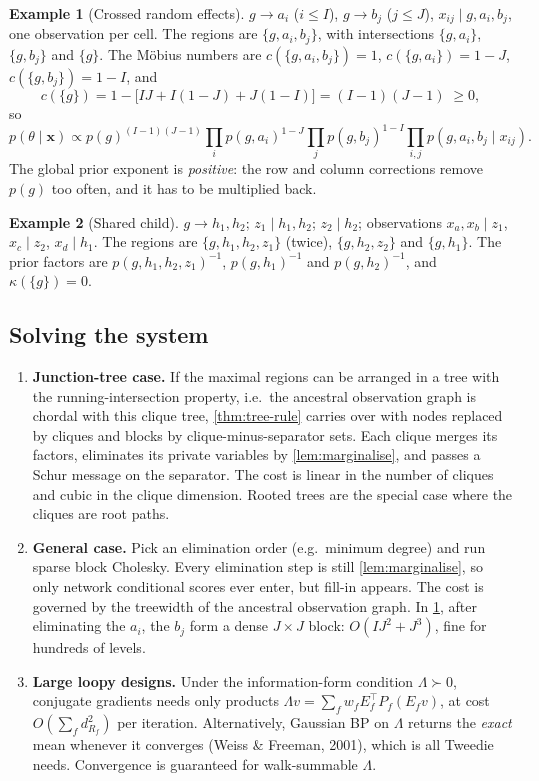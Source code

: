 \documentclass[11pt]{article}
\theoremstyle{definition}
\newtheorem{example}{Example}
\theoremstyle{remark}
\newcommand{\T}{\top}
\newcommand{\X}{\mathbf{x}}
\begin{document}
\begin{example}[Crossed random effects]\label{ex:crossed}
$g\to a_i$ ($i\le I$), $g\to b_j$ ($j\le J$), $x_{ij}\mid g,a_i,b_j$, one
observation per cell. The regions are $\{g,a_i,b_j\}$, with intersections
$\{g,a_i\}$, $\{g,b_j\}$ and $\{g\}$. The Möbius numbers are
$c(\{g,a_i,b_j\})=1$, $c(\{g,a_i\})=1-J$, $c(\{g,b_j\})=1-I$, and
\[
c(\{g\})=1-\big[IJ+I(1-J)+J(1-I)\big]=(I-1)(J-1)\;\ge0,
\]
so
\[
p(\theta\mid\X)\propto p(g)^{(I-1)(J-1)}\prod_ip(g,a_i)^{1-J}\prod_jp(g,b_j)^{1-I}\prod_{i,j}p(g,a_i,b_j\mid x_{ij}).
\]
The global prior exponent is \emph{positive}: the row and column corrections
remove $p(g)$ too often, and it has to be multiplied back.
\end{example}

\begin{example}[Shared child]\label{ex:diamond}
$g\to h_1,h_2$; $z_1\mid h_1,h_2$; $z_2\mid h_2$; observations
$x_a,x_b\mid z_1$, $x_c\mid z_2$, $x_d\mid h_1$. The regions are
$\{g,h_1,h_2,z_1\}$ (twice), $\{g,h_2,z_2\}$ and $\{g,h_1\}$. The prior factors
are $p(g,h_1,h_2,z_1)^{-1}$, $p(g,h_1)^{-1}$ and $p(g,h_2)^{-1}$, and
$\kappa(\{g\})=0$.
\end{example}

\subsection{Solving the system}

\begin{enumerate}
\item \textbf{Junction-tree case.} If the maximal regions can be arranged in a
 tree with the running-intersection property, i.e.\ the ancestral observation
 graph is chordal with this clique tree, \cref{thm:tree-rule} carries over with
 nodes replaced by cliques and blocks by clique-minus-separator sets. Each clique
 merges its factors, eliminates its private variables by
 \cref{lem:marginalise}, and passes a Schur message on the separator. The cost is
 linear in the number of cliques and cubic in the clique dimension. Rooted trees
 are the special case where the cliques are root paths.
\item \textbf{General case.} Pick an elimination order (e.g.\ minimum degree)
 and run sparse block Cholesky. Every elimination step is still
 \cref{lem:marginalise}, so only network conditional scores ever enter, but fill-in
 appears. The cost is governed by the treewidth of the ancestral observation
 graph. In \cref{ex:crossed}, after eliminating the $a_i$, the $b_j$ form a dense
 $J\times J$ block: $O(IJ^2+J^3)$, fine for hundreds of levels.
\item \textbf{Large loopy designs.} Under the information-form condition
 $\Lambda\succ0$, conjugate gradients needs only products
 $\Lambda v=\sum_fw_fE_f^\T P_f(E_fv)$, at cost $O(\sum_fd_{R_f}^2)$ per
 iteration. Alternatively, Gaussian BP on $\Lambda$ returns the \emph{exact} mean
 whenever it converges (Weiss \& Freeman, 2001), which is all Tweedie needs.
 Convergence is guaranteed for walk-summable $\Lambda$.
\end{enumerate}
\end{document}
